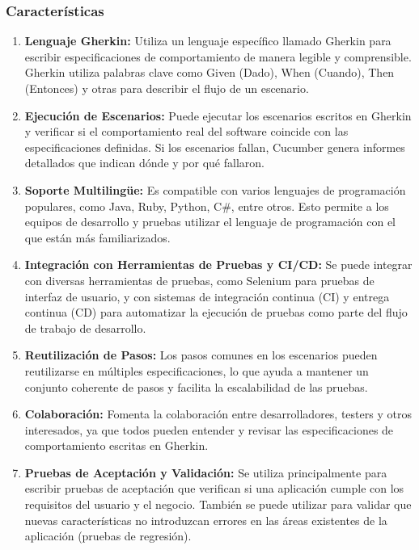 \documentclass[letterpaper]{article}
\begin{document}
\subsubsection{Características}
\begin{enumerate}[series=listWWNumxiii,label=\arabic*.,ref=\arabic*]
\item \textbf{Lenguaje Gherkin:} Utiliza un lenguaje específico llamado Gherkin para escribir especificaciones de
comportamiento de manera legible y comprensible. Gherkin utiliza palabras clave como
{\textquotedbl}Given{\textquotedbl} (Dado), {\textquotedbl}When{\textquotedbl} (Cuando),
{\textquotedbl}Then{\textquotedbl} (Entonces) y otras para describir el flujo de un escenario.
\item \textbf{Ejecución de Escenarios:} Puede ejecutar los escenarios escritos en Gherkin y verificar si el
comportamiento real del software coincide con las especificaciones definidas. Si los escenarios fallan, Cucumber genera
informes detallados que indican dónde y por qué fallaron.
\item \textbf{Soporte Multilingüe:} Es compatible con varios lenguajes de programación populares, como Java, Ruby,
Python, C\#, entre otros. Esto permite a los equipos de desarrollo y pruebas utilizar el lenguaje de programación con
el que están más familiarizados.
\item \textbf{Integración con Herramientas de Pruebas y CI/CD:} Se puede integrar con diversas herramientas de pruebas,
como Selenium para pruebas de interfaz de usuario, y con sistemas de integración continua (CI) y entrega continua (CD)
para automatizar la ejecución de pruebas como parte del flujo de trabajo de desarrollo.
\item \textbf{Reutilización de Pasos:} Los pasos comunes en los escenarios pueden reutilizarse en múltiples
especificaciones, lo que ayuda a mantener un conjunto coherente de pasos y facilita la escalabilidad de las pruebas.
\item \textbf{Colaboración:} Fomenta la colaboración entre desarrolladores, testers y otros interesados, ya que todos
pueden entender y revisar las especificaciones de comportamiento escritas en Gherkin.
\item \textbf{Pruebas de Aceptación y Validación:} Se utiliza principalmente para escribir pruebas de aceptación que
verifican si una aplicación cumple con los requisitos del usuario y el negocio. También se puede utilizar para validar
que nuevas características no introduzcan errores en las áreas existentes de la aplicación (pruebas de regresión).
\end{enumerate}
\end{document}
